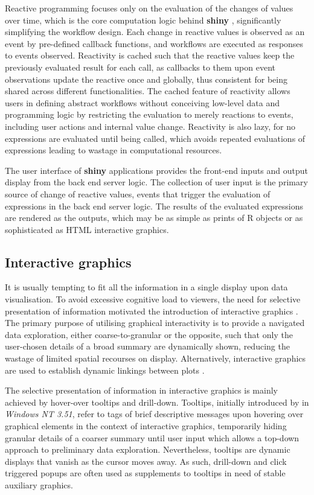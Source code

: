 \documentclass{aucklandthesis}
\begin{document}
Reactive programming focuses only on the evaluation of the changes of values over time, which is the core computation logic behind \textbf{shiny} \autocite{mshiny}, significantly simplifying the workflow design. Each change in reactive values is observed as an event by pre-defined callback functions, and workflows are executed as responses to events observed. Reactivity is cached such that the reactive values keep the previously evaluated result for each call, as callbacks to them upon event observations update the reactive once and globally, thus consistent for being shared across different functionalities. The cached feature of reactivity allows users in defining abstract workflows without conceiving low-level data and programming logic by restricting the evaluation to merely reactions to events, including user actions and internal value change. Reactivity is also lazy, for no expressions are evaluated until being called, which avoids repeated evaluations of expressions leading to wastage in computational resources.

The user interface of \textbf{shiny} applications provides the front-end inputs and output display from the back end server logic. The collection of user input is the primary source of change of reactive values, events that trigger the evaluation of expressions in the back end server logic. The results of the evaluated expressions are rendered as the outputs, which may be as simple as prints of R objects or as sophisticated as HTML interactive graphics.

\hypertarget{sec:int-graphics}{%
\subsection{Interactive graphics}\label{sec:int-graphics}}

It is usually tempting to fit all the information in a single display upon data visualisation. To avoid excessive cognitive load to viewers, the need for selective presentation of information motivated the introduction of interactive graphics \autocite{intg}. The primary purpose of utilising graphical interactivity is to provide a navigated data exploration, either coarse-to-granular or the opposite, such that only the user-chosen details of a broad summary are dynamically shown, reducing the wastage of limited spatial recourses on display. Alternatively, interactive graphics are used to establish dynamic linkings between plots \autocite{intg}.

The selective presentation of information in interactive graphics is mainly achieved by hover-over tooltips and drill-down. Tooltips, initially introduced by \textcite{tt} in \emph{Windows NT 3.51}, refer to tags of brief descriptive messages upon hovering over graphical elements in the context of interactive graphics, temporarily hiding granular details of a coarser summary until user input which allows a top-down approach to preliminary data exploration. Nevertheless, tooltips are dynamic displays that vanish as the cursor moves away. As such, drill-down \autocite{plotly} and click triggered popups are often used as supplements to tooltips in need of stable auxiliary graphics.
\end{document}
